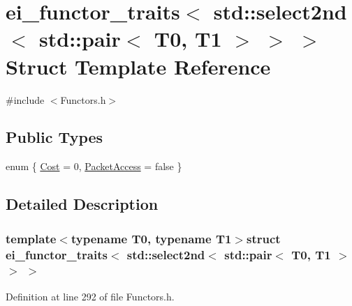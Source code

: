 \hypertarget{structei__functor__traits_3_01std_1_1select2nd_3_01std_1_1pair_3_01_t0_00_01_t1_01_4_01_4_01_4}{\section{ei\-\_\-functor\-\_\-traits$<$ std\-:\-:select2nd$<$ std\-:\-:pair$<$ T0, T1 $>$ $>$ $>$ Struct Template Reference}
\label{structei__functor__traits_3_01std_1_1select2nd_3_01std_1_1pair_3_01_t0_00_01_t1_01_4_01_4_01_4}
}


{\ttfamily \#include $<$Functors.\-h$>$}

\subsection*{Public Types}
\begin{DoxyCompactItemize}
\item 
enum \{ \hyperlink{structei__functor__traits_3_01std_1_1select2nd_3_01std_1_1pair_3_01_t0_00_01_t1_01_4_01_4_01_4_a49e9b8ecb52dd2d26f2e461befb23226a23078e54b9e7b1bce74ba7e0ca309587}{Cost} = 0, 
\hyperlink{structei__functor__traits_3_01std_1_1select2nd_3_01std_1_1pair_3_01_t0_00_01_t1_01_4_01_4_01_4_a49e9b8ecb52dd2d26f2e461befb23226ad350244ce2da340509c5983b179f27e8}{Packet\-Access} = false
 \}
\end{DoxyCompactItemize}


\subsection{Detailed Description}
\subsubsection*{template$<$typename T0, typename T1$>$struct ei\-\_\-functor\-\_\-traits$<$ std\-::select2nd$<$ std\-::pair$<$ T0, T1 $>$ $>$ $>$}



Definition at line 292 of file Functors.\-h.



